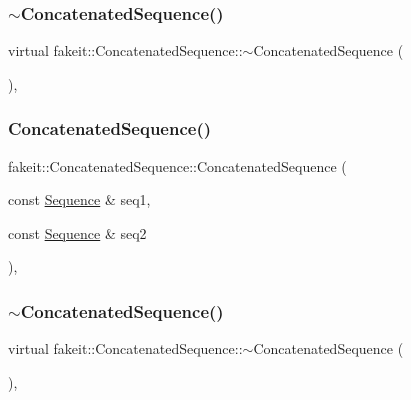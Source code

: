 \subsubsection{\texorpdfstring{$\sim$ConcatenatedSequence()}{~ConcatenatedSequence()}\hspace{0.1cm}{\footnotesize\ttfamily [1/9]}}
{\footnotesize\ttfamily virtual fakeit\+::\+Concatenated\+Sequence\+::$\sim$\+Concatenated\+Sequence (\begin{DoxyParamCaption}{ }\end{DoxyParamCaption})\hspace{0.3cm}{\ttfamily [inline]}, {\ttfamily [virtual]}}

\mbox{\label{classfakeit_1_1ConcatenatedSequence_abd7ca3783b69358f0ff4c15b970b01d0}} 
\subsubsection{\texorpdfstring{ConcatenatedSequence()}{ConcatenatedSequence()}\hspace{0.1cm}{\footnotesize\ttfamily [2/9]}}
{\footnotesize\ttfamily fakeit\+::\+Concatenated\+Sequence\+::\+Concatenated\+Sequence (\begin{DoxyParamCaption}\item[{const \mbox{\hyperlink{classfakeit_1_1Sequence}{Sequence}} \&}]{seq1,  }\item[{const \mbox{\hyperlink{classfakeit_1_1Sequence}{Sequence}} \&}]{seq2 }\end{DoxyParamCaption})\hspace{0.3cm}{\ttfamily [inline]}, {\ttfamily [protected]}}

\mbox{\label{classfakeit_1_1ConcatenatedSequence_a22346ae8c3c2af91f26144338750be25}} 
\subsubsection{\texorpdfstring{$\sim$ConcatenatedSequence()}{~ConcatenatedSequence()}\hspace{0.1cm}{\footnotesize\ttfamily [2/9]}}
{\footnotesize\ttfamily virtual fakeit\+::\+Concatenated\+Sequence\+::$\sim$\+Concatenated\+Sequence (\begin{DoxyParamCaption}{ }\end{DoxyParamCaption})\hspace{0.3cm}{\ttfamily [inline]}, {\ttfamily [virtual]}}

